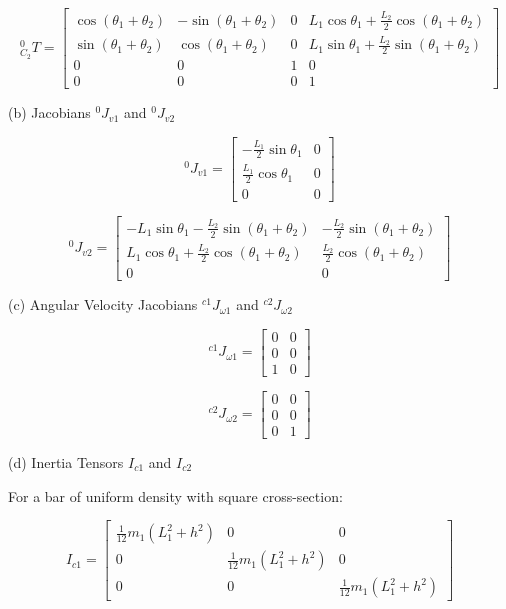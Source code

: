 \documentclass{article}
\begin{document}
\[
{}^{0}_{C_2}T = \begin{bmatrix} \cos(\theta_1 + \theta_2) & -\sin(\theta_1 + \theta_2) & 0 & L_1 \cos\theta_1 + \frac{L_2}{2} \cos(\theta_1 + \theta_2) \\ \sin(\theta_1 + \theta_2) & \cos(\theta_1 + \theta_2) & 0 & L_1 \sin\theta_1 + \frac{L_2}{2} \sin(\theta_1 + \theta_2) \\ 0 & 0 & 1 & 0 \\ 0 & 0 & 0 & 1 \end{bmatrix}
\]

(b) Jacobians ${}^0 J_{v1}$ and ${}^0 J_{v2}$

\[
{}^0 J_{v1} = \begin{bmatrix} -\frac{L_1}{2} \sin\theta_1 & 0 \\ \frac{L_1}{2} \cos\theta_1 & 0 \\ 0 & 0 \end{bmatrix}
\]

\[
{}^0 J_{v2} = \begin{bmatrix} -L_1 \sin\theta_1 - \frac{L_2}{2} \sin(\theta_1 + \theta_2) & -\frac{L_2}{2} \sin(\theta_1 + \theta_2) \\ L_1 \cos\theta_1 + \frac{L_2}{2} \cos(\theta_1 + \theta_2) & \frac{L_2}{2} \cos(\theta_1 + \theta_2) \\ 0 & 0 \end{bmatrix}
\]

(c) Angular Velocity Jacobians ${}^{c1} J_{\omega 1}$ and ${}^{c2} J_{\omega 2}$

\[
{}^{c1} J_{\omega 1} = \begin{bmatrix} 0 & 0 \\ 0 & 0 \\ 1 & 0 \end{bmatrix}
\]

\[
{}^{c2} J_{\omega 2} = \begin{bmatrix} 0 & 0 \\ 0 & 0 \\ 0 & 1 \end{bmatrix}
\]

(d) Inertia Tensors $I_{c1}$ and $I_{c2}$

For a bar of uniform density with square cross-section:

\[
I_{c1} = \begin{bmatrix} \frac{1}{12}m_1(L_1^2 + h^2) & 0 & 0 \\ 0 & \frac{1}{12}m_1(L_1^2 + h^2) & 0 \\ 0 & 0 & \frac{1}{12}m_1(L_1^2 + h^2) \end{bmatrix}
\]
\end{document}
